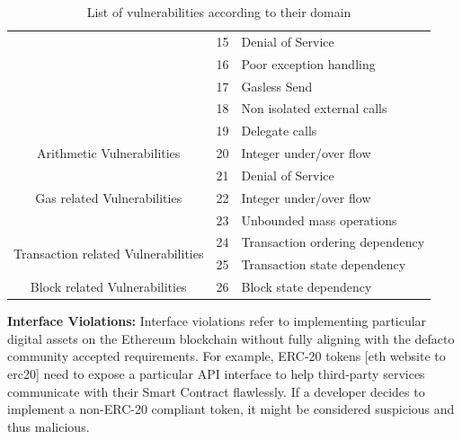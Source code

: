 \documentclass[a4paper,11pt]{article}
\begin{document}
\begin{table}[t]
\begin{center}
\begin{tabular}{||c|c|l||}
                                                                                & 15 & Denial of Service  \\ \cline{2-3}
                                                                                & 16 & Poor exception handling  \\ \cline{2-3}
                                                                                & 17 & Gasless Send  \\ \cline{2-3}
                                                                                & 18 & Non isolated external calls  \\ \cline{2-3}
                                                                                & 19 & Delegate calls \\ \cline{1-3}
                Arithmetic Vulnerabilities                                      & 20 & Integer under/over flow \\ \cline{1-3}
                \multirow{3}{*}{Gas related Vulnerabilities}                    & 21 & Denial of Service\\ \cline{2-3}
                                                                                & 22 & Integer under/over flow  \\ \cline{2-3}
                                                                                & 23 & Unbounded mass operations  \\ \cline{1-3}
                \multirow{2}{*}{Transaction related Vulnerabilities}            & 24 & Transaction ordering dependency\\ \cline{2-3}
                                                                                & 25 & Transaction state dependency  \\ \cline{1-3}
                Block related Vulnerabilities                                   & 26 & Block state dependency  \\ \cline{1-3}
            \end{tabular}
            \label{table:vulnerabilities}
            \caption{List of vulnerabilities according to their domain}
        \end{center}
\end{table}

\textbf{Interface Violations:} 
Interface violations refer to implementing particular digital assets on the
Ethereum blockchain without fully aligning with the defacto community accepted
requirements. For example, ERC-20 tokens [eth website to erc20] need to expose a
particular API interface to help third-party services communicate with their
Smart Contract flawlessly. If a developer decides to implement a non-ERC-20
compliant token, it might be considered suspicious and thus malicious.
\end{document}
